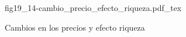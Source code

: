 \begin{figure}[h]
\centering
\def\svgwidth{0.5\textwidth}
{fig19_14-cambio_precio_efecto_riqueza.pdf_tex}
\caption{Cambios en los precios y efecto riqueza}
\label{fig19_14-cambio_precio_efecto_riqueza}
\end{figure}